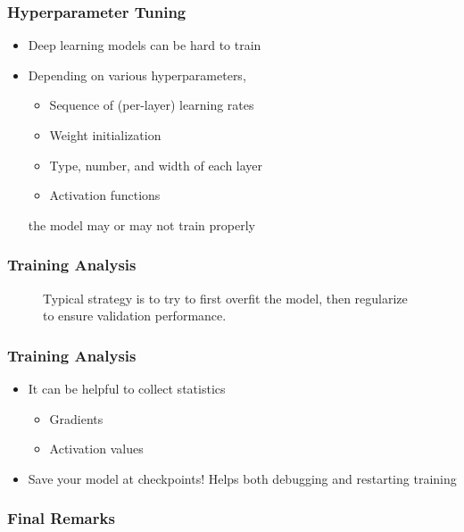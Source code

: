 \documentclass[10pt,mathserif]{beamer}
\begin{document}
\begin{frame}
  \frametitle{Hyperparameter Tuning}
  \begin{itemize}
  \item Deep learning models can be hard to train
  \item Depending on various hyperparameters,
    \begin{itemize}
    \item Sequence of (per-layer) learning rates
    \item Weight initialization
    \item Type, number, and width of each layer
    \item Activation functions
    \end{itemize}
    the model may or may not train properly
  \end{itemize}
\end{frame}

\begin{frame}
  \frametitle{Training Analysis}
  \begin{figure}[ht]
    \centering
    \caption{Typical strategy is to try to first overfit the model, then
      regularize to ensure validation performance. \label{fig:learning_curves} }
  \end{figure}
\end{frame}

\begin{frame}
  \frametitle{Training Analysis}
  \begin{itemize}
  \item It can be helpful to collect statistics
    \begin{itemize}
    \item Gradients
    \item Activation values
    \end{itemize}
  \item Save your model at checkpoints! Helps both debugging and restarting
    training
  \end{itemize}
\end{frame}

\begin{frame}
  \frametitle{Final Remarks}
  
\end{frame}

\end{document}
